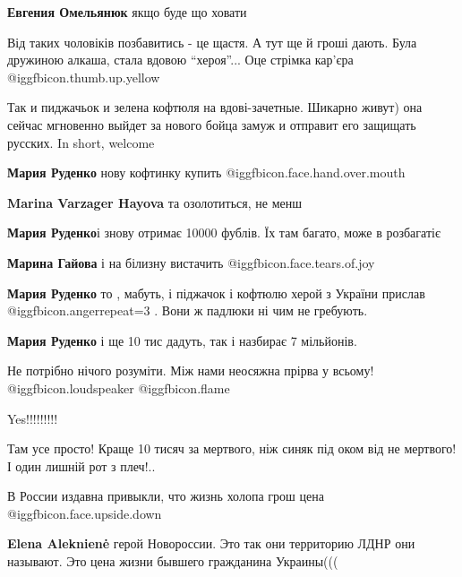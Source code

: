 \begin{itemize}
\begin{itemize}
\textbf{Евгения Омельянюк} якщо буде що ховати

\end{itemize} %


Від таких чоловіків позбавитись - це щастя. А тут ще й гроші дають. Була
дружиною алкаша, стала вдовою \enquote{хероя}... Оце стрімка кар'єра  @igg{fbicon.thumb.up.yellow} 


Так и пиджачьок и зелена кофтюля на вдові-зачетные. Шикарно живут) она сейчас
мгновенно выйдет за нового бойца замуж и отправит его защищать русских. In
short, welcome

\begin{itemize} %
\textbf{Мария Руденко} нову кофтинку купить  @igg{fbicon.face.hand.over.mouth} 

\textbf{Marina Varzager Hayova} та озолотиться, не менш

\textbf{Мария Руденко}і знову отримає 10000 фублів. Їх там багато, може в розбагатіє

\textbf{Марина Гайова} і на білизну вистачить  @igg{fbicon.face.tears.of.joy} 

\textbf{Мария Руденко} то , мабуть, і піджачок і кофтюлю херой з України прислав @igg{fbicon.anger}{repeat=3} . Вони ж падлюки ні чим не гребують.

\textbf{Мария Руденко} і ще 10 тис дадуть, так і назбирає 7 мільйонів.
\end{itemize} %

Не потрібно нічого розуміти. Між нами неосяжна прірва у всьому!  @igg{fbicon.loudspeaker}  @igg{fbicon.flame} 

Yes!!!!!!!!!


Там усе просто! Краще 10 тисяч за мертвого, ніж синяк під оком від не мертвого!
І один лишній рот з плеч!..

В России издавна привыкли, что жизнь холопа грош цена @igg{fbicon.face.upside.down} 

\begin{itemize} %
\textbf{Elena Aleknienė} герой Новороссии. Это так они территорию ЛДНР они называют. Это цена жизни бывшего гражданина Украины(((


\end{itemize}
\end{itemize}
